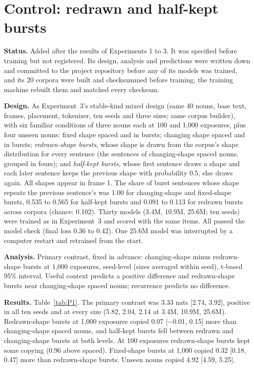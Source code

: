 \FloatBarrier
\section{Control: redrawn and half-kept bursts}\label{app:P}
\setcounter{table}{0}
\textbf{Status.} Added after the results of Experiments 1 to 3. It was specified before training but not registered. Its design, analysis and predictions were written down and committed to the project repository before any of its models was trained, and its 20 corpora were built and checksummed before training; the training machine rebuilt them and matched every checksum.

\textbf{Design.} As Experiment~3's stable-kind mixed design (same 40 nouns, base text, frames, placement, tokenizer, ten seeds and three sizes; same corpus builder), with six familiar conditions of three nouns each at 100 and 1,000 exposures, plus four unseen nouns: fixed shape spaced and in bursts; changing shape spaced and in bursts; \emph{redrawn-shape bursts}, whose shape is drawn from the corpus's shape distribution for every sentence (the sentences of changing-shape spaced nouns, grouped in fours); and \emph{half-kept bursts}, whose first sentence draws a shape and each later sentence keeps the previous shape with probability 0.5, else draws again. All shapes appear in frame 1. The share of burst sentences whose shape repeats the previous sentence's was 1.00 for changing-shape and fixed-shape bursts, 0.535 to 0.565 for half-kept bursts and 0.091 to 0.113 for redrawn bursts across corpora (chance: 0.102). Thirty models (3.4M, 10.9M, 25.6M; ten seeds) were trained as in Experiment~3 and scored with the same items. All passed the model check (final loss 0.36 to 0.42). One 25.6M model was interrupted by a computer restart and retrained from the start.

\textbf{Analysis.} Primary contrast, fixed in advance: changing-shape minus redrawn-shape bursts at 1,000 exposures, seed-level (sizes averaged within seed), t-based 95\% interval. Useful context predicts a positive difference and redrawn-shape bursts near changing-shape spaced nouns; recurrence predicts no difference.

\textbf{Results.} Table~\ref{tab:P1}. The primary contrast was 3.33 nats [2.74, 3.92], positive in all ten seeds and at every size (5.82, 2.04, 2.14 at 3.4M, 10.9M, 25.6M). Redrawn-shape bursts at 1,000 exposures copied 0.07 [$-$0.01, 0.15] more than changing-shape spaced nouns, and half-kept bursts fell between redrawn and changing-shape bursts at both levels. At 100 exposures redrawn-shape bursts kept some copying (0.96 above spaced). Fixed-shape bursts at 1,000 copied 0.32 [0.18, 0.47] more than redrawn-shape bursts. Unseen nouns copied 4.92 [4.59, 5.25].

\begin{table}[!htbp]
\centering\small
\caption{Control: copy score by condition and paired differences (nats; seed-level means over ten seeds, sizes averaged within seed; t-based 95\% intervals).}
\label{tab:P1}

\end{table}
